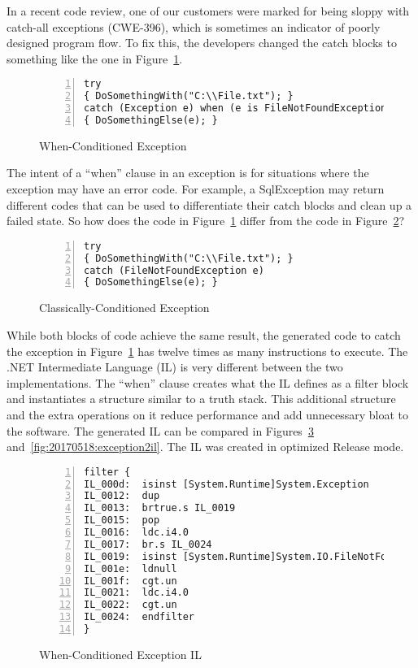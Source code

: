 In a recent code review, one of our customers were marked for being sloppy with catch-all exceptions (CWE-396), which is sometimes an indicator of poorly designed program flow. To fix this, the developers changed the catch blocks to something like the one in Figure~\ref{fig:20170518:exception}.

\begin{figure}[h]
\begin{lstlisting}[style=CSharpStyle,numbers=left,stepnumber=1]
try
{ DoSomethingWith("C:\\File.txt"); }
catch (Exception e) when (e is FileNotFoundException)
{ DoSomethingElse(e); }
\end{lstlisting}
\caption{When-Conditioned Exception}
\label{fig:20170518:exception}
\end{figure}

The intent of a ``when'' clause in an exception is for situations where the exception may have an error code. For example, a SqlException may return different codes that can be used to differentiate their catch blocks and clean up a failed state. So how does the code in Figure~\ref{fig:20170518:exception} differ from the code in Figure~\ref{fig:20170518:exception2}?

\begin{figure}[h]
\begin{lstlisting}[style=CSharpStyle,numbers=left,stepnumber=1]
try
{ DoSomethingWith("C:\\File.txt"); }
catch (FileNotFoundException e)
{ DoSomethingElse(e); }
\end{lstlisting}
\caption{Classically-Conditioned Exception}
\label{fig:20170518:exception2}
\end{figure}

While both blocks of code achieve the same result, the generated code to catch the exception in Figure~\ref{fig:20170518:exception} has twelve times as many instructions to execute. The .NET Intermediate Language (IL) is very different between the two implementations. The ``when'' clause creates what the IL defines as a filter block and instantiates a structure similar to a truth stack. This additional structure and the extra operations on it reduce performance and add unnecessary bloat to the software. The generated IL can be compared in Figures~\ref{fig:20170518:exceptionil} and~\ref{fig:20170518:exception2il}. The IL was created in optimized Release mode.

\begin{figure}[h]
\begin{lstlisting}[style=CSharpStyle,numbers=left,stepnumber=1]
filter {
IL_000d:  isinst [System.Runtime]System.Exception
IL_0012:  dup 
IL_0013:  brtrue.s IL_0019
IL_0015:  pop 
IL_0016:  ldc.i4.0 
IL_0017:  br.s IL_0024
IL_0019:  isinst [System.Runtime]System.IO.FileNotFoundException
IL_001e:  ldnull 
IL_001f:  cgt.un 
IL_0021:  ldc.i4.0 
IL_0022:  cgt.un 
IL_0024:  endfilter 
}
\end{lstlisting}
\caption{When-Conditioned Exception IL}
\label{fig:20170518:exceptionil}
\end{figure}

